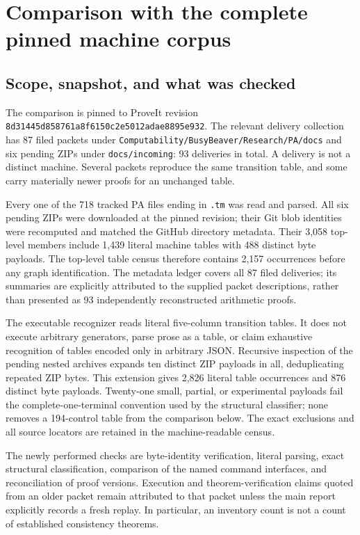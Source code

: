 \section{Comparison with the complete pinned machine corpus}
\label{sec:corpus-comparison}

\subsection{Scope, snapshot, and what was checked}

The comparison is pinned to ProveIt revision
\texttt{8d31445d858761a8f6150c2e5012adae8895e932}.
The relevant delivery collection has 87 filed packets under
\texttt{Computability/BusyBeaver/Research/PA/docs} and six pending ZIPs
under \texttt{docs/incoming}: 93 deliveries in total. A delivery is not
a distinct machine. Several packets reproduce the same transition table,
and some carry materially newer proofs for an unchanged table.

Every one of the 718 tracked PA files ending in \texttt{.tm} was read and
parsed. All six pending ZIPs were downloaded at the pinned revision; their
Git blob identities were recomputed and matched the GitHub directory
metadata. Their 3,058 top-level members include 1,439 literal machine tables
with 488 distinct byte payloads. The top-level table census therefore
contains 2,157 occurrences before any graph identification. The metadata
ledger covers all 87 filed deliveries; its summaries are explicitly
attributed to the supplied packet descriptions, rather than presented as
93 independently reconstructed arithmetic proofs.

The executable recognizer reads literal five-column transition tables. It
does not execute arbitrary generators, parse prose as a table, or claim
exhaustive recognition of tables encoded only in arbitrary JSON. Recursive
inspection of the pending nested archives expands ten distinct ZIP payloads
in all, deduplicating repeated ZIP bytes. This extension gives 2,826 literal
table occurrences and 876 distinct byte payloads. Twenty-one small,
partial, or experimental payloads fail the complete-one-terminal convention
used by the structural classifier; none removes a 194-control table from
the comparison below. The exact exclusions and all source locators are
retained in the machine-readable census.

The newly performed checks are byte-identity verification, literal parsing,
exact structural classification, comparison of the named command interfaces,
and reconciliation of proof versions. Execution and theorem-verification
claims quoted from an older packet remain attributed to that packet unless
the main report explicitly records a fresh replay. In particular, an
inventory count is not a count of established consistency theorems.

